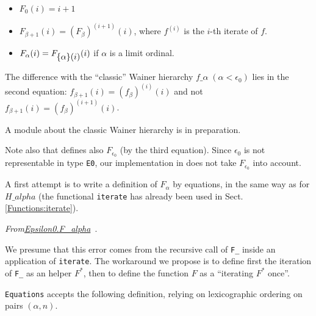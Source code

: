 \label{F_equations}
\begin{itemize}
\item $F_0(i)=i+1$
\item $F_{\beta+1}(i)= (F_\beta)^{(i+1)}(i)$, where $f^{(i)}$ is the $i$-th iterate of $f$.
\item $F_\alpha(i) = F_{\mbox{$\{\alpha\}(i)$}} (i)$ if $\alpha$ is a limit ordinal.
\end{itemize}

\begin{remark}
The difference with the ``classic'' Wainer hierarchy 
$f\_\alpha\;(\alpha<\epsilon_0)$ lies in the second equation:
$f_{\beta+1}(i) = (f_\beta)^{(i)}(i)$ and not
$f_{\beta+1}(i) = (f_\beta)^{(i+1)}(i)$.

A module about 
the classic Wainer hierarchy is in preparation.

Note also that \cite{KS81} defines also $F_{\epsilon_0}$ (by the third equation). Since $\epsilon_0$ is not representable in type \texttt{E0}, our implementation in \coq{} does not take $F_{\epsilon_0}$ into account.

\end{remark}

A first attempt is to write a definition of $F_\alpha$ by equations, in the same way as for $H\_alpha$ (the functional \texttt{iterate} has already been used in Sect.\vref{Functions:iterate}).







\emph{From\href{../theories/html/hydras.Epsilon0.F_alpha.html}{Epsilon0.F\_alpha}~}.


 
 


We presume that this error comes from the recursive call of \texttt{F\_} inside
an application of \texttt{iterate}. The workaround we propose is to define first 
the iteration of \texttt{F\_}  as an helper $F^*$, then to define the function $F$ as a ``iterating $F^*$ once''.

\texttt{Equations} accepts the following definition, relying on  lexicographic ordering on pairs $(\alpha,n)$.


\label{sect:F-equations}

\label{Functions:F-alpha}
  
